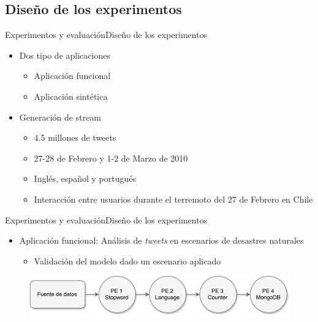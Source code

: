 \subsection*{Diseño de los experimentos}
\begin{frame}{Experimentos y evaluación}{Diseño de los experimentos}
\begin{itemize}
\item Dos tipo de aplicaciones
	\begin{itemize}
		\item Aplicación funcional
		\item Aplicación sintética
	\end{itemize}
\item Generación de stream
\begin{itemize}
	\item 4.5 millones de tweets
	\item 27-28 de Febrero y 1-2 de Marzo de 2010
	\item Inglés, español y portugués
	\item Interacción entre usuarios durante el terremoto del 27 de Febrero en Chile
\end{itemize}
\end{itemize}
\end{frame}

\begin{frame}{Experimentos y evaluación}{Diseño de los experimentos}
\begin{itemize}
	\item Aplicación funcional: Análisis de \textit{tweets} en escenarios de desastres naturales
	\begin{itemize}
		\item Validación del modelo dado un escenario aplicado
	\end{itemize}
\end{itemize}
\begin{figure}[!hb]
	\centering
		\includegraphics[scale=0.55]{images/App1.pdf}
\end{figure}
\end{frame}

